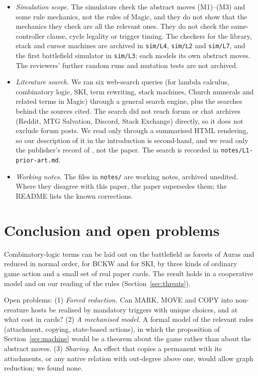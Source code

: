 \documentclass[11pt]{article}
\theoremstyle{definition}
\begin{document}
\begin{itemize}[nosep,leftmargin=*]
  \texttt{notes/L3} (labels, Aura movers and copy effects) and \texttt{notes/L2} (stack
  reordering); \texttt{notes/L4} describes its library searches in prose. The rejected
  label cards of Section~\ref{sec:cards} were not among the texts we compared with
  Scryfall lookups.
\item \emph{Simulation scope.} The simulators check the abstract moves (M1)--(M3) and some
  rule mechanics, not the rules of Magic, and they do not show that the mechanics they
  check are all the relevant ones. They do not check the same-controller clause, cycle
  legality or trigger timing. The checkers for the library, stack and cursor machines are
  archived in \texttt{sim/L4}, \texttt{sim/L2} and \texttt{sim/L7}, and the first
  battlefield simulator in \texttt{sim/L3}; each models its own abstract moves. The
  reviewers' further random runs and mutation tests are not archived.
\item \emph{Literature search.} We ran six web-search queries (for lambda calculus,
  combinatory logic, SKI, term rewriting, stack machines, Church numerals and related
  terms in Magic) through a general search engine, plus the searches behind the sources
  cited. The search did not reach forum or chat archives (Reddit, MTG Salvation, Discord,
  Stack Exchange) directly, so it does not exclude forum posts. We read \citet{cbh2019}
  only through a summarised HTML rendering, so our description of it in the introduction
  is second-hand, and we read only the publisher's record of \citet{chatterjee2016}, not
  the paper. The search is recorded in \texttt{notes/L1-prior-art.md}.
\item \emph{Working notes.} The files in \texttt{notes/} are working notes, archived
  unedited. Where they disagree with this paper, the paper supersedes them; the README
  lists the known corrections.
\end{itemize}

\section{Conclusion and open problems}

Combinatory-logic terms can be laid out on the battlefield as forests of Auras and reduced
in normal order, for BCKW and for SKI, by three kinds of ordinary game action and a small
set of real paper cards. The result holds in a cooperative model and on our reading of the
rules (Section~\ref{sec:threats}).

Open problems: (1) \emph{Forced reduction.} Can MARK, MOVE and COPY into non-creature hosts
be realised by mandatory triggers with unique choices, and at what cost in cards? (2) \emph{A
mechanised model.} A formal model of the relevant rules (attachment, copying, state-based
actions), in which the proposition of Section~\ref{sec:machine} would be a theorem about
the game rather than about the abstract moves. (3) \emph{Sharing.} An effect that copies
a permanent with its attachments, or any native relation with out-degree above one, would
allow graph reduction; we found none.
\end{document}
